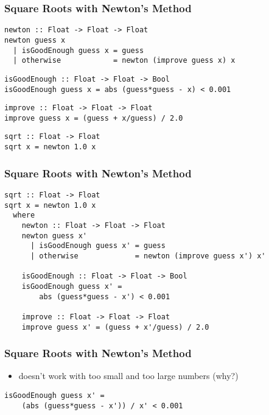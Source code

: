 \documentclass[dvipsnames]{beamer}
\theoremstyle{plain}
\begin{document}
\begin{frame}[fragile]
  \frametitle{Square Roots with Newton's Method}

  \begin{lstlisting}
newton :: Float -> Float -> Float
newton guess x
  | isGoodEnough guess x = guess
  | otherwise            = newton (improve guess x) x
  \end{lstlisting}

  \pause
  \begin{lstlisting}
isGoodEnough :: Float -> Float -> Bool
isGoodEnough guess x = abs (guess*guess - x) < 0.001
  \end{lstlisting}

  \pause
  \begin{lstlisting}
improve :: Float -> Float -> Float
improve guess x = (guess + x/guess) / 2.0
  \end{lstlisting}

  \pause
  \begin{lstlisting}
sqrt :: Float -> Float
sqrt x = newton 1.0 x
  \end{lstlisting}
\end{frame}

\begin{frame}[fragile]
  \frametitle{Square Roots with Newton's Method}

  \begin{lstlisting}
sqrt :: Float -> Float
sqrt x = newton 1.0 x
  where
    newton :: Float -> Float -> Float
    newton guess x'
      | isGoodEnough guess x' = guess
      | otherwise             = newton (improve guess x') x'

    isGoodEnough :: Float -> Float -> Bool
    isGoodEnough guess x' =
        abs (guess*guess - x') < 0.001

    improve :: Float -> Float -> Float
    improve guess x' = (guess + x'/guess) / 2.0
  \end{lstlisting}
\end{frame}

\begin{frame}[fragile]
  \frametitle{Square Roots with Newton's Method}

  \begin{itemize}
    \item doesn't work with too small and too large numbers (why?)
  \end{itemize}

  \begin{lstlisting}
isGoodEnough guess x' =
    (abs (guess*guess - x')) / x' < 0.001
  \end{lstlisting}
\end{frame}
\end{document}
